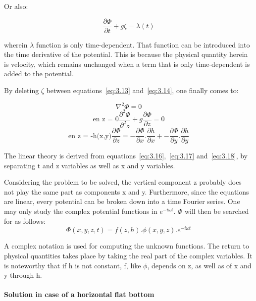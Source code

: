 Or also:

\[ \frac{\partial \Phi}{\partial t}+g\zeta = \lambda(t)\]


wherein $\lambda$ function is only time-dependent. That function can be
introduced into the time derivative of the potential. This is because the
physical quantity herein is velocity, which remains unchanged when a term that
is only time-dependent is added to the potential.

By deleting $\zeta$ between equations~\ref{eq:3.13} and~\ref{eq:3.14}, one
finally comes to:

\begin{equation}
  \nabla^{2}\Phi = 0
  \label{eq:3.16}
\end{equation}
\begin{equation}
  \text{en z = 0} \frac{\partial^{2} \Phi}{\partial^{2} z} + g\frac{\partial \Phi}{\partial z} = 0
  \label{eq:3.17}
\end{equation}
\begin{equation}
  \text{en z = -h(x,y)} \frac{\partial \Phi}{\partial z} =
    - \frac{\partial\Phi}{\partial x}.\frac{\partial h}{\partial x} +
    - \frac{\partial\Phi}{\partial y}.\frac{\partial h}{\partial y}
  \label{eq:3.18}
\end{equation}

The linear theory is derived from equations~\eqref{eq:3.16},~\eqref{eq:3.17}
and~\eqref{eq:3.18}, by separating t and z variables as well as x and y
variables.

Considering the problem to be solved, the vertical component z probably does
not play the same part as components x and y. Furthermore, since the equations
are linear, every potential can be broken down into a time Fourier series. One
may only study the complex potential functions in $e^{-i\omega{t}}$. $\Phi$
will then be searched for as follows:
\begin{equation}
  \Phi(x,y,z,t) = f (z,h).\phi(x,y,z).e^{-i\omega{t}}
\end{equation}

A complex notation is used for computing the unknown functions. The return to physical quantities takes place by taking the real part of the complex variables. It is noteworthy that if h is not constant, f, like $\phi$, depends on z, as well as of x and y through h.


\paragraph{Solution in case of a horizontal flat bottom}


